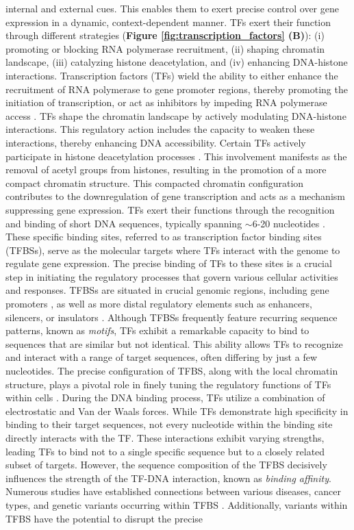 \documentclass[a4paper, titlepage, openright]{book}
\begin{document}
internal and external cues. This enables them to exert precise control over gene expression in a dynamic, context-dependent manner. TFs exert their function through different strategies (\textbf{Figure \ref{fig:transcription_factors} (B)}): (i) promoting or blocking RNA polymerase recruitment, (ii) shaping chromatin landscape, (iii) catalyzing histone deacetylation, and (iv) enhancing DNA-histone interactions. Transcription factors (TFs) wield the ability to either enhance the recruitment of RNA polymerase to gene promoter regions, thereby promoting the initiation of transcription, or act as inhibitors by impeding RNA polymerase access \citep{fuda2009defining}. TFs shape the chromatin landscape by actively modulating DNA-histone interactions. This regulatory action includes the capacity to weaken these interactions, thereby enhancing DNA accessibility. Certain TFs actively participate in histone deacetylation processes \citep{liu2016beyond}. This involvement manifests as the removal of acetyl groups from histones, resulting in the promotion of a more compact chromatin structure. This compacted chromatin configuration contributes to the downregulation of gene transcription and acts as a mechanism suppressing gene expression. TFs exert their functions through the recognition and binding of short DNA sequences, typically spanning $\sim$6-20 nucleotides \citep{stewart2012transcription}. These specific binding sites, referred to as transcription factor binding sites (TFBSs), serve as the molecular targets where TFs interact with the genome to regulate gene expression. The precise binding of TFs to these sites is a crucial step in initiating the regulatory processes that govern various cellular activities and responses. TFBSs are situated in crucial genomic regions, including gene promoters \citep{whitfield2012functional}, as well as more distal regulatory elements such as enhancers, silencers, or insulators \citep{gotea2010homotypic,lemon2000orchestrated,nolis2009transcription}. Although TFBSs frequently feature recurring sequence patterns, known as \emph{motifs}, TFs exhibit a remarkable capacity to bind to sequences that are similar but not identical. This ability allows TFs to recognize and interact with a range of target sequences, often differing by just a few nucleotides. The precise configuration of TFBS, along with the local chromatin structure, plays a pivotal role in finely tuning the regulatory functions of TFs within cells \citep{mendenhall2013locus,maurano2015large}. During the DNA binding process, TFs utilize a combination of electrostatic and Van der Waals forces. While TFs demonstrate high specificity in binding to their target sequences, not every nucleotide within the binding site directly interacts with the TF. These interactions exhibit varying strengths, leading TFs to bind not to a single specific sequence but to a closely related subset of targets. However, the sequence composition of the TFBS decisively influences the strength of the TF-DNA interaction, known as \emph{binding affinity}. Numerous studies have established connections between various diseases, cancer types, and genetic variants occurring within TFBS \citep{docquier2005heightened, katainen2015ctcf, yu2019gata1}. Additionally, variants within TFBS have the potential to disrupt the precise 
\end{document}
